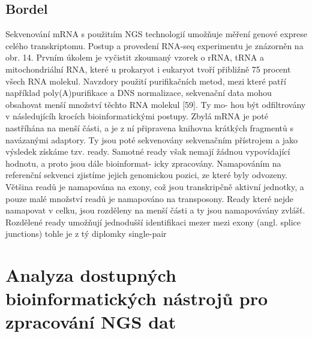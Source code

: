 \documentclass[czech,DP]{thesiskiv}
\numberwithin{equation}{section}
\begin{document}
\section{Bordel}
Sekvenování mRNA s použitıím NGS technologií umožňuje měření genové exprese celého
transkriptomu. Postup a provedení RNA-seq experimentu je znázorněn na obr. 14.
Prvním úkolem je vyčistit zkoumaný vzorek o rRNA, tRNA a mitochondriální RNA,
které u prokaryot i eukaryot tvoří přibližně 75 procent všech RNA molekul. Navzdory použití
purifikačních metod, mezi které patří například poly(A)purifikace a DNS normalizace,
sekvenační data mohou obsahovat menší množství těchto RNA molekul [59]. Ty mo-
hou být odfiltrovány v následujícíh krocích bioinformatickými postupy. Zbylá mRNA
je poté nastříhána na menší části, a je z ní připravena knihovna krátkých fragmentů s
navázanými adaptory. Ty jsou poté sekvenovány sekvenačním přístrojem a jako výsledek
získáme tzv. ready.
Samotné ready však nemají žádnou vypovídající hodnotu, a proto jsou dále bioinformat-
icky zpracovány. Namapováním na referenční sekvenci zjistíme jejich genomickou pozici,
ze které byly odvozeny. Většina readů je namapována na exony, což jsou transkripčně
aktivní jednotky, a pouze malé množství readů je namapováno na transposony. Ready
které nejde namapovat v celku, jsou rozděleny na menší části a ty jsou namapovávány
zvlášť. Rozdělené ready umožňují jednodušší identifikaci mezer mezi exony (angl. splice
junctions)
tohle je z tý diplomky single-pair

\chapter{Analyza dostupných bioinformatických nástrojů pro zpracování NGS dat}
\end{document}
